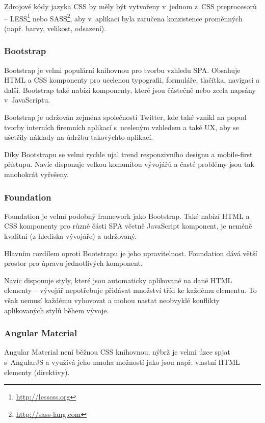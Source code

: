 Zdrojové kódy jazyka CSS by měly být vytvořeny v~jednom z~CSS preprocesorů~\cite{css:preproc} -- LESS\footnote{\url{http://lesscss.org}} nebo SASS\footnote{\url{http://sass-lang.com}}, aby v~aplikaci byla zaručena konzistence proměnných (např. barvy, velikost, odsazení).

\subsubsection*{Bootstrap}

Bootstrap je velmi populární knihovnou pro tvorbu vzhledu SPA. Obsahuje HTML a CSS komponenty pro ucelenou typografii, formuláře, tlačítka, navigaci a další. Bootstrap také nabízí komponenty, které jsou částečně nebo zcela napsány v~JavaScriptu.

Bootstrap je udržován zejména společností Twitter, kde také vznikl na popud tvorby interních firemních aplikací s~uceleným vzhledem a také UX, aby se ušetřily náklady na údržbu takovýchto aplikací.

Díky Bootstrapu se velmi rychle ujal trend responzivního designu a mobile-first přístupu. Navíc disponuje velkou komunitou vývojářů a časté problémy jsou tak mnohokrát vyřešeny.

\subsubsection*{Foundation}

Foundation je velmi podobný framework jako Bootstrap. Také nabízí HTML a CSS komponenty pro různé části SPA včetně JavaScript komponent, je neméně kvalitní (z hlediska vývojáře) a udržovaný.

Hlavním rozdílem oproti Bootstrapu je jeho upravitelnost. Foundation dává větší prostor pro úpravu jednotlivých komponent. 

Navíc disponuje styly, které jsou automaticky aplikované na dané HTML elementy -- vývojář nepotřebuje přidávat množství tříd ke každému elementu. To však nemusí každému vyhovovat a mohou nastat neobvyklé konflikty aplikovaných stylů během vývoje.

\subsubsection*{Angular Material}

Angular Material není běžnou CSS knihovnou, nýbrž je velmi úzce spjat s~AngularJS a využívá jeho mnoha možností jako jsou např. vlastní HTML elementy (direktivy).

